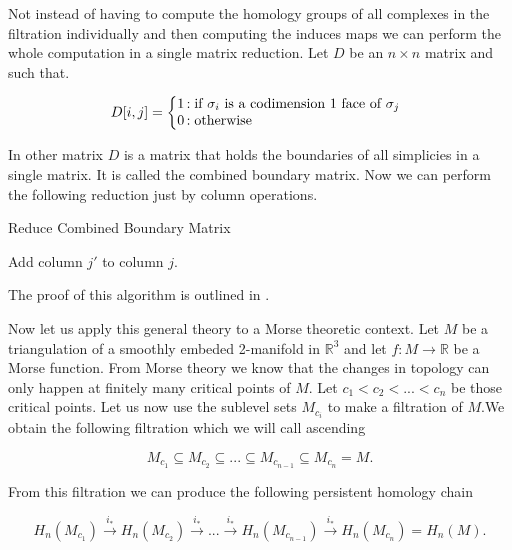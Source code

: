 Not instead of having to compute the homology groups of all complexes in the filtration individually and then computing the induces maps we can perform the whole computation in a single matrix reduction. Let $D$ be an $n\times n$ matrix and such that.

   $$
   D[i, j] = \left\{
       \begin{array}{@{}l@{\thinspace}l}
           \text{1}  &: \text{if } \sigma_i \text{ is a codimension 1 face of } \sigma_j \\
           \text{0}  &: \text{otherwise} \\
       \end{array}
   \right.
   $$

In other matrix $D$ is a matrix that holds the boundaries of all simplicies in a single matrix. It is called the combined boundary matrix. Now we can perform the following reduction just by column operations.


\begin{algorithm}
\caption{Reduce Combined Boundary Matrix}

\begin{algorithmic}[1]


        \State Add column $j'$ to column $j$.
    \EndWhile
\EndFor

\end{algorithmic}
\end{algorithm}

The proof of this algorithm is outlined in \cite{persistence-original}.

Now let us apply this general theory to a Morse theoretic context. Let $M$ be a triangulation of a smoothly embeded 2-manifold in $\mathbb{R}^3$ and let $f : M \to \mathbb{R}$ be a Morse function. From Morse theory we know that the changes in topology can only happen at finitely many critical points of $M$. Let $c_1 < c_2 < ... < c_n$ be those critical points. Let us now use the sublevel sets $M_{c_i}$  to make a filtration of $M$.We obtain the following filtration which we will call ascending

$$ M_{c_1} \subseteq M_{c_2} \subseteq ... \subseteq M_{c_{n-1}} \subseteq M_{c_n} = M.$$

From this filtration we can produce the following persistent homology chain

$$ H_n(M_{c_1}) \overset{i_*}{\longrightarrow} H_n(M_{c_2}) \overset{i_*}{\longrightarrow} ... \overset{i_*}{\longrightarrow} H_n(M_{c_{n-1}}) \overset{i_*}{\longrightarrow} H_n(M_{c_n}) = H_n(M).$$

